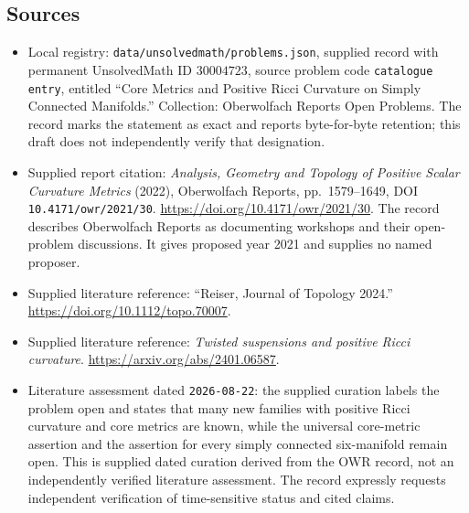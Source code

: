 \documentclass[11pt]{article}
\begin{document}
\subsection{Sources}
\begin{itemize}
\item Local registry: \texttt{data/unsolvedmath/problems.json}, supplied record with permanent UnsolvedMath ID \(30004723\), source problem code \texttt{catalogue entry}, entitled ``Core Metrics and Positive Ricci Curvature on Simply Connected Manifolds.'' Collection: Oberwolfach Reports Open Problems. The record marks the statement as exact and reports byte-for-byte retention; this draft does not independently verify that designation.
\item Supplied report citation: \emph{Analysis, Geometry and Topology of Positive Scalar Curvature Metrics} (2022), Oberwolfach Reports, pp.~1579--1649, DOI \texttt{10.4171/owr/2021/30}. \url{https://doi.org/10.4171/owr/2021/30}. The record describes Oberwolfach Reports as documenting workshops and their open-problem discussions. It gives proposed year 2021 and supplies no named proposer.
\item Supplied literature reference: ``Reiser, Journal of Topology 2024.'' \url{https://doi.org/10.1112/topo.70007}.
\item Supplied literature reference: \emph{Twisted suspensions and positive Ricci curvature}. \url{https://arxiv.org/abs/2401.06587}.
\item Literature assessment dated \texttt{2026-08-22}: the supplied curation labels the problem open and states that many new families with positive Ricci curvature and core metrics are known, while the universal core-metric assertion and the assertion for every simply connected six-manifold remain open. This is supplied dated curation derived from the OWR record, not an independently verified literature assessment. The record expressly requests independent verification of time-sensitive status and cited claims.
\end{itemize}
\end{document}

